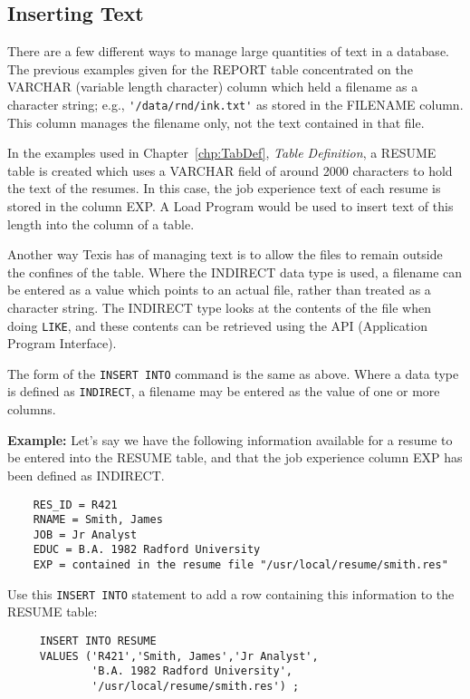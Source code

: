 \subsection{Inserting Text}

There are a few different ways to manage large quantities of text in a
database.  The previous examples given for the REPORT table
concentrated on the VARCHAR (variable length character) column which
held a filename as a character string; e.g., \verb`'/data/rnd/ink.txt'`
as stored in the FILENAME column.  This column manages the filename
only, not the text contained in that file.

In the examples used in Chapter~\ref{chp:TabDef}, {\em Table
Definition}, a RESUME table is created which uses a VARCHAR field of
around 2000 characters to hold the text of the resumes.  In this case,
the job experience text of each resume is stored in the column EXP.  A
Load Program would be used to insert text of this length into the
column of a table.

Another way Texis has of managing text is to allow the files to remain
outside the confines of the table.  Where the INDIRECT data type is
used, a filename can be entered as a value which points to an actual
file, rather than treated as a character string.  The INDIRECT type
looks at the contents of the file when doing \verb`LIKE`, and these contents
can be retrieved using the API (Application Program Interface).

The form of the {\tt INSERT INTO} command is the same as above.  Where a
data type is defined as \verb`INDIRECT`, a filename may be entered as the
value of one or more columns.

{\bf Example:}
Let's say we have the following information available for a resume to
be entered into the RESUME table, and that the job experience column EXP
has been defined as INDIRECT.

\begin{verbatim}
    RES_ID = R421
    RNAME = Smith, James
    JOB = Jr Analyst
    EDUC = B.A. 1982 Radford University
    EXP = contained in the resume file "/usr/local/resume/smith.res"
\end{verbatim}

Use this {\tt INSERT INTO} statement to add a row containing this
information to the RESUME table:

\begin{verbatim}
     INSERT INTO RESUME
     VALUES ('R421','Smith, James','Jr Analyst',
             'B.A. 1982 Radford University',
             '/usr/local/resume/smith.res') ;
\end{verbatim}

